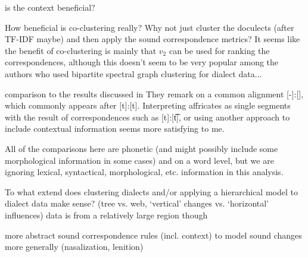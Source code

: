 \documentclass{article}
\begin{document}

is the context beneficial?

How beneficial is co-clustering really? Why not just cluster the doculects (after TF-IDF maybe) and then apply the sound correspondence metrics? It seems like the benefit of co-clustering is mainly that $v_2$ can be used for ranking the correspondences, although this doesn't seem to be very popular among the authors who used bipartite spectral graph clustering for dialect data...

comparison to the results discussed in \citet{wieling2011bipartite}
They remark on a common alignment [-]:[\textesh], which commonly appears after [t]:[t]. Interpreting affricates as single segments with the result of correspondences such as [t]:[\t{t\textesh}], or using another approach to include contextual information seems more satisfying to me.


All of the comparisons here are phonetic (and might possibly include some morphological information in some cases) and on a word level, but we are ignoring lexical, syntactical, morphological, etc. information in this analysis.

To what extend does clustering dialects and/or applying a hierarchical model to dialect data make sense? (tree vs. web, `vertical' changes vs. `horizontal' influences)
data is from a relatively large region though

more abstract sound correspondence rules (incl. context) to model sound changes more generally (nasalization, lenition)



\end{document}
